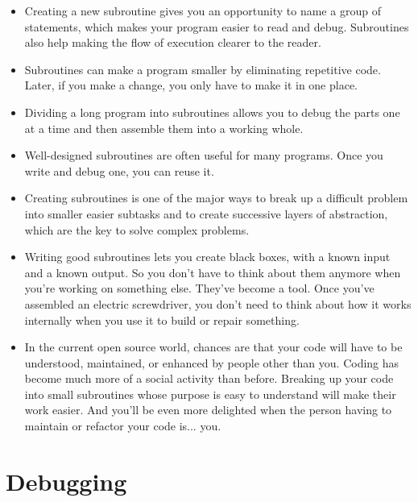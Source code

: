\begin{itemize}

\item Creating a new subroutine gives you an opportunity to 
name a group of statements, which makes your program easier 
to read and debug. Subroutines also help making the flow of 
execution clearer to the reader.

\item Subroutines can make a program smaller by eliminating 
repetitive code.  Later, if you make a change, you only have
to make it in one place.

\item Dividing a long program into subroutines allows you 
to debug the parts one at a time and then assemble them 
into a working whole.

\item Well-designed subroutines are often useful for many programs.
Once you write and debug one, you can reuse it.

\item Creating subroutines is one of the major ways to 
break up a difficult problem into smaller easier subtasks 
and to create successive layers of abstraction, which are 
the key to solve complex problems.

\item Writing good subroutines lets you create black boxes, with 
a known input and a known output. So you don't have to think 
about them anymore when you're working on something else.  
They've become a tool.  Once you've assembled an electric 
screwdriver, you don't need to think about how it works internally 
when you use it to build or repair something.

\item In the current open source world, chances are that your 
code will have to be understood, maintained, or enhanced by 
people other than you. Coding has become much more of a social 
activity than before. Breaking up your code into small subroutines 
whose purpose is easy to understand will make their work easier. 
And you'll be even more delighted when the person 
having to maintain or refactor your code is... you.

\end{itemize}


\section{Debugging}

